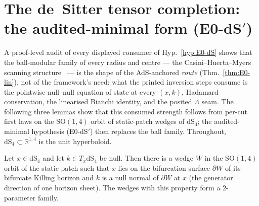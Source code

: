 
\renewcommand{\thesection}{E0dS}%
\section{The de~Sitter tensor completion: the audited-minimal form
  (E0-dS$'$)}
\label{app:e0ds-min}

A proof-level audit of every displayed consumer of
Hyp.~\ref{hyp:E0-dS} shows that the ball-modular family of every
radius and centre --- the Casini--Huerta--Myers scanning
structure~\cite{CasiniHuertaMyers2011} --- is the shape of the
AdS-anchored \emph{route} (Thm.~\ref{thm:E0-lin}), not of the
framework's need: what the printed inversion steps consume is the
pointwise null--null equation of state at every $(x,k)$, Hadamard
conservation, the linearised Bianchi identity, and the posited
$\Lambda$ seam. The following three lemmas show that this consumed
strength follows from per-cut first laws on the $\mathrm{SO}(1,4)$
orbit of static-patch wedges of $\mathrm{dS}_4$; the audited-minimal
hypothesis (E0-dS$'$) then replaces the ball family. Throughout,
$\mathrm{dS}_4\subset\mathbb R^{1,4}$ is the unit hyperboloid.

\begin{lemma}
\label{lem:e0ds-coverage}
Let $x\in\mathrm{dS}_4$ and let $k\in T_x\mathrm{dS}_4$ be null. Then
there is a wedge $W$ in the $\mathrm{SO}(1,4)$ orbit of the static
patch such that $x$ lies on the bifurcation surface $\partial W$ of
its bifurcate Killing horizon and $k$ is a null normal of
$\partial W$ at $x$ (the generator direction of one horizon sheet).
The wedges with this property form a $2$-parameter family.
\end{lemma}

